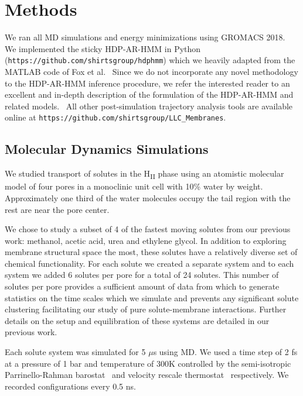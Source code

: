 \documentclass[journal=jpcbfk,manuscript=article]{achemso}
\begin{document}
  \section{Methods}
    
  We ran all MD simulations and energy minimizations using GROMACS 2018.~\cite{bekker_gromacs:_1993,berendsen_gromacs:_1995,van_der_spoel_gromacs:_2005,hess_gromacs_2008}  
  We implemented the sticky HDP-AR-HMM in Python 
  (\texttt{https://github.com/shirtsgroup/hdphmm}) which we heavily adapted from
  the MATLAB code of Fox et al.~\cite{fox_nonparametric_2009} Since we do not incorporate
  any novel methodology to the HDP-AR-HMM inference procedure, we refer the 
  interested reader to an excellent and in-depth description of the formulation of
  the HDP-AR-HMM and related models.~\cite{fox_bayesian_2010} 
  All other post-simulation trajectory analysis tools are available online at
  \texttt{https://github.com/shirtsgroup/LLC\_Membranes}.

  \subsection{Molecular Dynamics Simulations}

  We studied transport of solutes in the H\textsubscript{II} phase using an
  atomistic molecular model of four pores in a monoclinic unit cell with 
  10\% water by weight. Approximately one third of the water molecules 
  occupy the tail region with the rest are near the pore center.~\cite{coscia_chemically_2019}
  
  We chose to study a subset of 4 of the fastest moving solutes from our previous
  work: methanol, acetic acid, urea and ethylene glycol. In addition to exploring 
  membrane structural space the most, these solutes have a relatively diverse set
  of chemical functionality. For each solute we created a separate system and to 
  each system we added 6 solutes per pore for a total of 24 solutes. This number 
  of solutes per pore provides a sufficient amount of data from which to generate 
  statistics on the time scales which we simulate and prevents any significant
  solute clustering facilitating our study of pure solute-membrane interactions. 
  Further details on the setup and equilibration of these systems are detailed 
  in our previous work.~\cite{coscia_chemically_2019}
  
  Each solute system was simulated for 5 $\mu$s using MD. We used a time step of 2 
  fs at a pressure of 1 bar and temperature of 300K controlled by the semi-isotropic 
  Parrinello-Rahman barostat~\cite{parrinello_polymorphic_1981} and velocity rescale 
  thermostat~\cite{bussi_canonical_2007} respectively. We recorded configurations every 0.5 ns.
\end{document}
